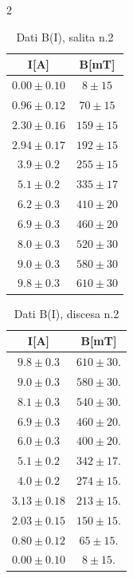 \begin{multicols}{2}
\begin{table}[H]
	\centering
    \begin{tabular}{|c|c|}
    \hline
    \textbf{I[A]} & \textbf{B[mT]}	\\ \hline\hline
$0.00\pm0.10$&	$8  \pm	15$\\ \hline	
$0.96\pm0.12$&	$70 \pm 15$\\ \hline	
$2.30\pm0.16$&	$159\pm	15$\\ \hline	
$2.94\pm0.17$&	$192\pm	15$\\ \hline	
$3.9\pm	0.2 $&	$255\pm	15$\\ \hline	
$5.1\pm	0.2 $&  $335\pm	17$\\ \hline	
$6.2\pm	0.3 $&  $410\pm	20$\\ \hline	
$6.9\pm	0.3 $&   $460\pm20$\\ \hline	
$8.0\pm	0.3 $&  $520\pm	30$\\ \hline	
$9.0\pm	0.3 $&  $580\pm	30$\\ \hline	
$9.8\pm	0.3 $&  $610\pm	30$\\ \hline	
\end{tabular}
\caption{Dati B(I), salita n.2}
\end{table}
\begin{table}[H]
	\centering
    \begin{tabular}{|c|c|} \hline
\textbf{I[A]} & \textbf{B[mT]}	\\ \hline\hline
$9.8\pm0.3 $&	$610\pm30. $	\\ \hline
$9.0\pm0.3 $&  $580\pm30. $\\ \hline    
$8.1\pm0.3 $&  $540\pm30. $\\ \hline    
$6.9\pm0.3 $&    $460\pm20. $\\ \hline    
$6.0\pm0.3 $&    $400\pm20. $\\ \hline    
$5.1\pm0.2 $&    $342\pm17. $\\ \hline    
$4.0\pm0.2 $&    $274\pm15. $\\ \hline    
$3.13\pm0.18$&	$213\pm15. $  \\ \hline  
$2.03\pm0.15$&	$150\pm15.$	\\ \hline
$0.80\pm0.12$&	$65\pm15. $  \\ \hline  
$0.00\pm0.10$&	$8\pm15.  $  \\ \hline  
\end{tabular}
\caption{Dati B(I), discesa n.2}
\end{table}
\end{multicols}

